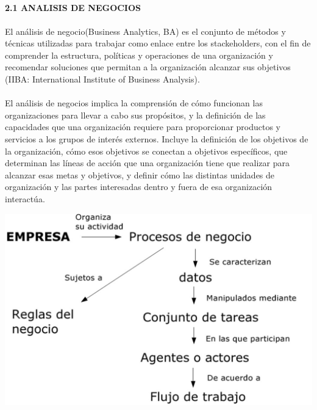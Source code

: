 \begin{flushleft}
\textbf{}\\
\textbf{}\\
\textbf{}\\
\textbf{}\\
\textbf{}\\
\textbf{}\\
\textbf{}\\
\textbf{}\\
\textbf{}\\
\textbf{}\\
\textbf{}\\
\textbf{}\\
\textbf{}\\
\textbf{}\\
\textbf{}\\
\textbf{}\\
\textbf{2.1 ANALISIS DE NEGOCIOS}\\
\textbf{}\\
El análisis de negocio(Business Analytics, BA) es el conjunto de métodos y técnicas utilizadas para trabajar como enlace entre los stackeholders, con el fin de comprender la estructura, políticas y operaciones de una organización y recomendar soluciones que permitan a la organización alcanzar sus objetivos (IIBA: International Institute of Business Analysis).\\
\textbf{}\\
El análisis de negocios implica la comprensión de cómo funcionan las organizaciones para llevar a cabo sus propósitos, y la definición de las capacidades que una organización requiere para proporcionar productos y servicios a los grupos de interés externos. Incluye la definición de los objetivos de la organización, cómo esos objetivos se conectan a objetivos específicos, que determinan las líneas de acción que una organización tiene que realizar para alcanzar esas metas y objetivos, y definir cómo las distintas unidades de organización y las partes interesadas dentro y fuera de esa organización interactúa.
\begin{center}
		\includegraphics[width=15cm]{./Imagenes/anegocios}
		\end{center}


\end{flushleft}
